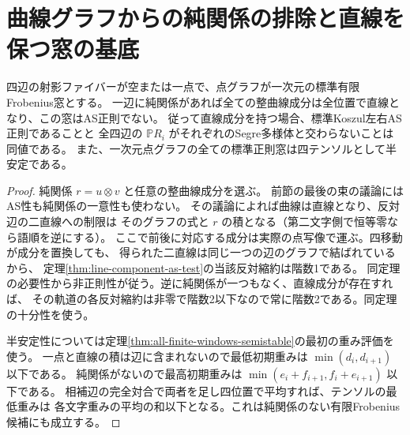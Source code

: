 \section{曲線グラフからの純関係の排除と直線を保つ窓の基底}
\label{sec:curve-graph-pure-exclusion}
\begin{theorem}\label{thm:curve-graph-pure-exclusion}
四辺の射影ファイバーが空または一点で、点グラフが一次元の標準有限Frobenius窓とする。
一辺に純関係があれば全ての整曲線成分は全位置で直線となり、この窓はAS正則でない。
従って直線成分を持つ場合、標準Koszul左右AS正則であることと
全四辺の $\mathbb P R_i$ がそれぞれのSegre多様体と交わらないことは同値である。
また、一次元点グラフの全ての標準正則窓は四テンソルとして半安定である。
\end{theorem}
\begin{proof}
純関係 $r=u\otimes v$ と任意の整曲線成分を選ぶ。
前節の最後の束の議論にはAS性も純関係の一意性も使わない。
その議論によれば曲線は直線となり、反対辺の二直線への制限は
そのグラフの式と $r$ の積となる（第二文字側で恒等零なら語順を逆にする）。
ここで前後に対応する成分は実際の点写像で運ぶ。四移動が成分を置換しても、
得られた二直線は同じ一つの辺のグラフで結ばれているから、
定理\ref{thm:line-component-as-test}の当該反対縮約は階数1である。
同定理の必要性から非正則性が従う。逆に純関係が一つもなく、直線成分が存在すれば、
その軌道の各反対縮約は非零で階数2以下なので常に階数2である。同定理の十分性を使う。

半安定性については定理\ref{thm:all-finite-windows-semistable}の最初の重み評価を使う。
一点と直線の積は辺に含まれないので最低初期重みは $\min(d_i,d_{i+1})$ 以下である。
純関係がないので最高初期重みは $\min(e_i+f_{i+1},f_i+e_{i+1})$ 以下である。
相補辺の完全対合で両者を足し四位置で平均すれば、テンソルの最低重みは
各文字重みの平均の和以下となる。これは純関係のない有限Frobenius候補にも成立する。
\end{proof}

